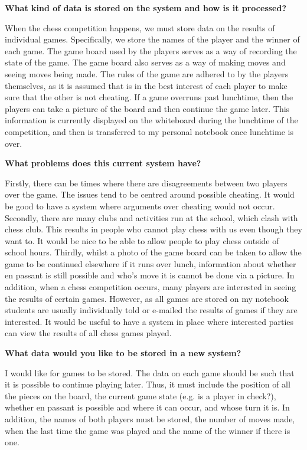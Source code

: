 \textbf{What kind of data is stored on the system and how is it processed?}

When the chess competition happens, we must store data on the results of individual games. Specifically, we store the names of the player and the winner of each game. The game board used by the players serves as a way of recording the state of the game. The game board also serves as a way of making moves and seeing moves being made. The rules of the game are adhered to by the players themselves, as it is assumed that is in the best interest of each player to make sure that the other is not cheating. If a game overruns past lunchtime, then the players can take a picture of the board and then continue the game later. This information is currently displayed on the whiteboard during the lunchtime of the competition, and then is transferred to my personal notebook once lunchtime is over. 

\textbf{What problems does this current system have?}

Firstly, there can be times where there are disagreements between two players over the game. The issues tend to be centred around possible cheating. It would be good to have a system where arguments over cheating would not occur. Secondly, there are many clubs and activities run at the school, which clash with chess club. This results in people who cannot play chess with us even though they want to. It would be nice to be able to allow people to play chess outside of school hours. Thirdly, whilst a photo of the game board can be taken to allow the game to be continued elsewhere if it runs over lunch, information about whether en passant is still possible and who’s move it is cannot be done via a picture.  In addition, when a chess competition occurs, many players are interested in seeing the results of certain games. However, as all games are stored on my notebook students are usually individually told or e-mailed the results of games if they are interested. It would be useful to have a system in place where interested parties can view the results of all chess games played.

\textbf{What data would you like to be stored in a new system?}

I would like for games to be stored. The data on each game should be such that it is possible to continue playing later. Thus, it must include the position of all the pieces on the board, the current game state (e.g. is a player in check?), whether en passant is possible and where it can occur, and whose turn it is. In addition, the names of both players must be stored, the number of moves made, when the last time the game was played and the name of the winner if there is one. 

